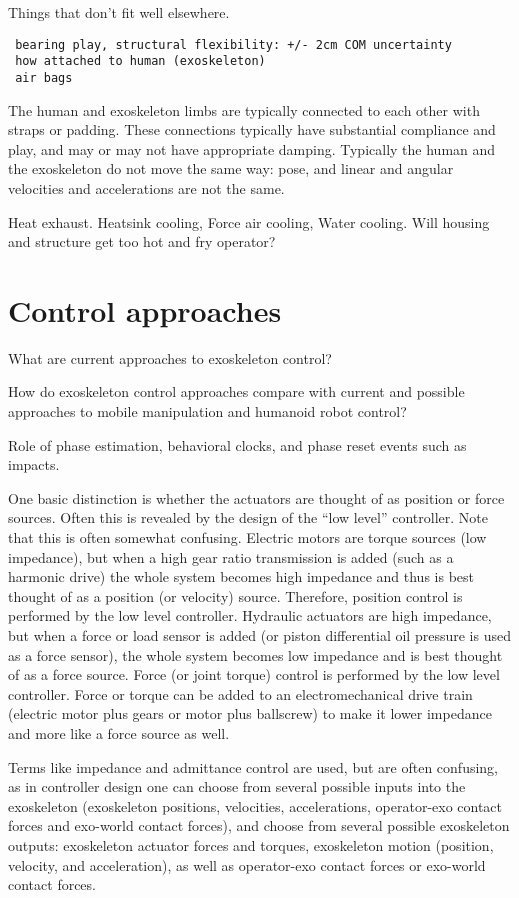 \documentclass[letterpaper,12pt,fullpage]{article}
\begin{document}
Things that don't fit well elsewhere.

\begin{verbatim}
 bearing play, structural flexibility: +/- 2cm COM uncertainty
 how attached to human (exoskeleton)
 air bags
\end{verbatim}

The human and exoskeleton limbs are typically connected to each
other with straps or padding. These connections typically have substantial
compliance and play, and may or may not have appropriate damping.
Typically the human and the exoskeleton do not move the same way:
pose, and linear and angular velocities and accelerations are not the same.

Heat exhaust. Heatsink cooling, Force air cooling, Water cooling.
Will housing and structure get too hot and fry operator?

\section{Control approaches}

What are current approaches to exoskeleton control?

How do exoskeleton control approaches compare with current and
possible approaches to mobile manipulation and humanoid robot control?

Role of phase estimation, behavioral clocks, and phase reset events
such as impacts.

One basic distinction is whether the actuators are thought of as position
or force sources. Often this is revealed by the design of the ``low level''
controller. Note that this is often somewhat confusing. Electric motors
are torque sources (low impedance), but when a high gear ratio transmission
is added (such as a harmonic drive) the whole system becomes high impedance
and thus is best thought of as a position (or velocity) source. Therefore,
position control is performed by the low level controller. Hydraulic actuators
are high impedance, but when a force or load sensor is added (or piston differential
oil pressure is used as a force sensor), the whole system becomes low impedance
and is best thought of as a force source. Force (or joint torque) control is
performed by the low level controller. Force or torque can be added to an
electromechanical drive train (electric motor plus gears or motor plus ballscrew)
to make it lower impedance and more like a force source as well.

Terms like impedance and admittance control are used, but are often confusing,
as in controller design one can choose from several possible
inputs into the exoskeleton (exoskeleton positions,
velocities, accelerations, operator-exo contact forces and
exo-world contact forces), and choose from several possible exoskeleton
outputs: exoskeleton actuator forces and torques, exoskeleton
motion (position, velocity, and acceleration), as well as operator-exo
contact forces or exo-world contact forces.
\end{document}
